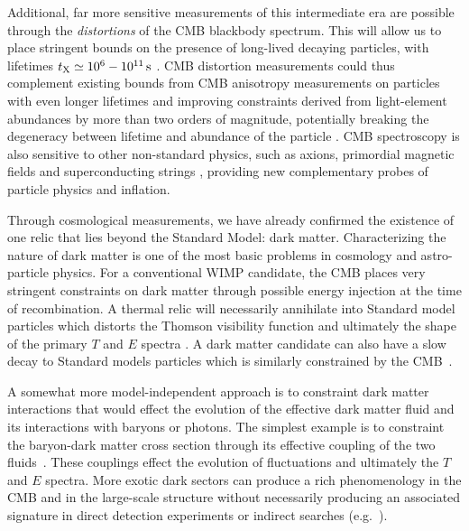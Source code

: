 Additional, far more sensitive measurements of this intermediate era are possible through the {\it distortions} of the 
CMB blackbody spectrum. This will allow us to place stringent bounds on the presence of long-lived decaying 
particles, with lifetimes $t_{\rm X}\simeq 10^6-10^{11}\,{\rm s}$ \citep{Sarkar1984, Kawasaki1986, Hu1993b, Chluba2013fore, Chluba2013PCA, Dimastrogiovanni2015}. CMB distortion measurements could thus complement existing bounds from CMB anisotropy measurements on particles with even longer lifetimes \cite{Chen2004, Zhang2007, Diamanti2014} and improving constraints derived from light-element abundances \citep{Kawasaki2005, Kawasaki2005b, Jedamzik2006} by more than two orders of magnitude, potentially breaking the degeneracy between lifetime and abundance of the particle \citep{Chluba2011therm, Chluba2013fore, Chluba2013PCA}.
%
CMB spectroscopy is also sensitive to other non-standard physics, such as axions, primordial magnetic fields and superconducting strings \citep[e.g.,][]{Jedamzik2000, Tashiro2012, Dolgov2013, Tashiro2013, Caldwell2013}, providing new complementary probes of particle physics and inflation.


Through cosmological measurements, we have already confirmed the existence of one relic that lies beyond the Standard Model: dark matter. Characterizing the nature of dark matter is one of the most basic problems in cosmology and astro-particle physics.  For a conventional WIMP candidate, the CMB places very stringent constraints on dark matter through possible energy injection at the time of recombination.  A thermal relic will necessarily annihilate into Standard model particles which distorts the Thomson visibility function and ultimately the shape of the primary $T$ and $E$ spectra \citep{Peebles2000, Chen2004, Padmanabhan2005}.  A dark matter candidate can also have a slow decay to Standard models particles which is similarly constrained by the CMB~\cite{Chen2004, Zhang2007, Diamanti2014, Slatyer:2016qyl}.

A somewhat more model-independent approach is to constraint dark matter interactions that would effect the evolution of the effective dark matter fluid and its interactions with baryons or photons.  The simplest example is to constraint the baryon-dark matter cross section through its effective coupling of the two fluids~\cite{Dvorkin:2013cea}.  These couplings effect the evolution of fluctuations and ultimately the $T$ and $E$ spectra.  More exotic dark sectors can produce a rich phenomenology in the CMB and in the large-scale structure without necessarily producing an associated signature in direct detection experiments or indirect searches (e.g.~\cite{Cyr-Racine:2013fsa,Buen-Abad:2015ova,Lesgourgues:2015wza}). 

